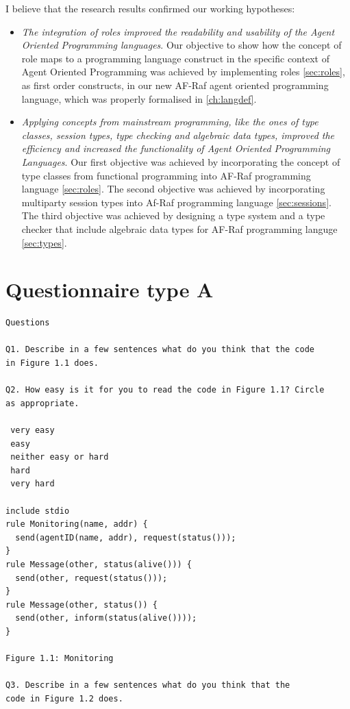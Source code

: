 \documentclass[a4paper,12pt,oneside,fleqn]{book} %
\begin{document}
{I believe that the research results confirmed our working hypotheses:

\begin{itemize}
\item \textit{The integration of roles improved the readability and
usability of the Agent Oriented Programming languages}. Our objective to
show how the concept of role maps to a programming language construct in
the specific context of Agent Oriented Programming was achieved by
implementing roles \autoref{sec:roles}, as first order constructs, in our new AF-Raf
agent oriented programming language, which was properly formalised in
\autoref{ch:langdef}.

\item \textit{Applying concepts from mainstream programming, like the ones
  of type classes, session types, type checking and algebraic data types,
improved the efficiency and increased the functionality of Agent Oriented
Programming Languages}. Our first objective was achieved by incorporating
the concept of type classes from functional programming into AF-Raf
programming language \autoref{sec:roles}. The second objective was achieved
by incorporating multiparty session types into Af-Raf programming language
\autoref{sec:sessions}. The third objective was achieved by designing a
type system and a type checker that include algebraic data types for AF-Raf
programming languge \autoref{sec:types}.

\end{itemize}
\newpage
\appendix
\chapter{Questionnaire type A}\label{app:SurveyA} %
\begin{verbatim}
Questions

Q1. Describe in a few sentences what do you think that the code
in Figure 1.1 does.

Q2. How easy is it for you to read the code in Figure 1.1? Circle
as appropriate.

 very easy
 easy
 neither easy or hard
 hard
 very hard

include stdio
rule Monitoring(name, addr) {
  send(agentID(name, addr), request(status()));
}
rule Message(other, status(alive())) {
  send(other, request(status()));
}
rule Message(other, status()) {
  send(other, inform(status(alive())));
}

Figure 1.1: Monitoring

Q3. Describe in a few sentences what do you think that the
code in Figure 1.2 does.


\end{verbatim}}
\end{document}
